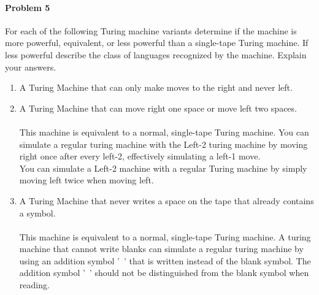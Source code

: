 \documentclass{article}
\begin{document}
    


\paragraph{Problem 5} For each of the following Turing machine variants determine if the machine
is more powerful, equivalent, or less powerful than a single-tape Turing machine. If less powerful
describe the class of languages recognized by the machine. Explain your answers.
\begin{enumerate}[\indent a)]
    \item A Turing Machine that can only make moves to the right and never left.
    
    \item A Turing Machine that can move right one space or move left two spaces.
    \paragraph{} This machine is equivalent to a normal, single-tape Turing machine. You can simulate
    a regular turing machine with the Left-2 turing machine by moving right once after every left-2, effectively 
    simulating a left-1 move.
    \\You can simulate a Left-2 machine with a regular Turing machine by simply moving left twice when moving left.
    \item A Turing Machine that never writes a space on the tape that already contains a symbol.
    \paragraph{} This machine is equivalent to a normal, single-tape Turing machine. A turing machine that cannot 
    write blanks can simulate a regular turing machine by using an addition symbol '~' that is written instead of the blank symbol.
    The addition symbol '~' should not be distinguished from the blank symbol when reading.
    
\end{enumerate}
\end{document}
